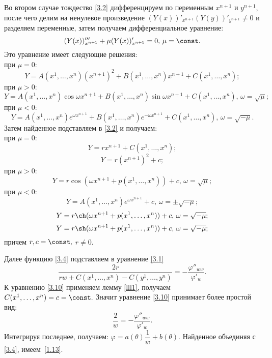 Во втором случае тождество \eqref{3.2} дифференцируем по переменным $x^{n+1}$ и $y^{n+1}$, после чего делим на ненулевое произведение $(Y(x))'_{x^{n+1}}(Y(y))'_{y^{n+1}}\ne0$ и разделяем переменные, затем получаем дифференциальное уравнение: \begin{equation}\label{3.3} (Y(x))'''_{x^{n+1}} + \mu (Y(x))'_{x^{n+1}}  = 0,\,\mu = \const. \end{equation}
Это уравнение имеет следующие решения:
\\ при $\mu=0$:
$$ Y = A(x^1,\ldots,x^n)(x^{n+1})^2 + B(x^1,\ldots,x^n)x^{n+1} + C(x^1,\ldots,x^n); $$
при $\mu>0$:
$$ Y = A(x^1,\ldots,x^n)\cos\omega x^{n+1} + B(x^1,\ldots,x^n)\sin\omega x^{n+1} + C(x^1,\ldots,x^n),\,\omega = \sqrt{\mu}; $$
при $\mu<0$:
$$ Y = A(x^1,\ldots,x^n)e^{\omega x^{n+1}} + B(x^1,\ldots,x^n)e^{-\omega x^{n+1}} + C(x^1,\ldots,x^n),\,\omega = \sqrt{-\mu}. $$
Затем найденное подставляем в \eqref{3.2} и получаем:
\\ при $\mu=0$:
\begin{equation}\label{3.4} Y = rx^{n+1} + C(x^1,\ldots,x^n); \end{equation}
\begin{equation}\label{3.5} Y = r(x^{n+1})^2 + c; \end{equation}
при $\mu>0$:
\begin{equation}\label{3.6} Y = r\cos(\omega x^{n+1} + p(x^1,\ldots,x^n)) + c,\,\omega = \sqrt{\mu}; \end{equation}
при $\mu<0$:
\begin{equation}\label{3.7} Y = A(x^1,\ldots,x^n)e^{\omega x^{n+1}} + c,\,\omega = \pm\sqrt{-\mu}; \end{equation}
\begin{equation}\label{3.8} Y = r\ch(\omega x^{n+1} + p(x^1,\ldots,x^n)) + c,\,\omega = \sqrt{-\mu}; \end{equation}
\begin{equation}\label{3.9} Y = r\sh(\omega x^{n+1} + p(x^1,\ldots,x^n)) + c,\,\omega = \sqrt{-\mu}; \end{equation}
причем $r,c = \const,$ $r\ne0$.

Далее функцию \eqref{3.4} подставляем в уравнение \eqref{3.1}
\begin{equation}\label{3.10} \dfrac{2r}{rw + C(x^1,\ldots,x^n) - C(y^1,\ldots,y^n)} = - \dfrac{\varphi''_{ww}}{\varphi'_{w}}. \end{equation}
К уравнению \eqref{3.10} применяем лемму \eqref{lll1}, получаем $C(x^1,\ldots,x^n) = c = \const.$ Значит уравнение \eqref{3.10} принимает более простой вид:
$$ \dfrac{2}{w} = - \dfrac{\varphi''_{ww}}{\varphi'_{w}}. $$
Интегрируя последнее, получаем: $\varphi = a(\theta)\dfrac{1}{w} + b(\theta)$. Найденное объединяя с \eqref{3.4}, имеем~\eqref{1.13}.


